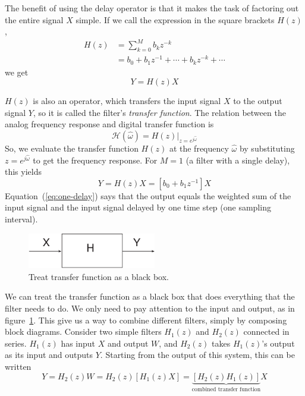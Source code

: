 The benefit of using the delay operator is that it makes the task of
factoring out the entire signal $X$ simple. If we call the expression
in the square brackets $H(z)$,
\begin{align}
H(z) &= \sum_{k=0}^M b_k z^{-k}\\
     &= b_0 + b_1z^{-1} + \cdots + b_k z^{-k} + \cdots
\end{align}
we get
\begin{equation}
Y = H(z)X
\end{equation}

$H(z)$ is also an operator, which transfers the input signal
$X$ to the output signal $Y$, so it is called the filter's
\emph{transfer function}. 
%
%
The relation between the analog frequency
response and digital transfer function is
\begin{equation}
\mathcal{H}(\hat{\omega}) = H(z)|_{z=e^{j\hat{\omega}}}
\end{equation}
So, we evaluate the transfer function $H(z)$ at the frequency
$\hat{\omega}$ by substituting $z=e^{j\hat\omega}$ to get the
frequency response.
For $M=1$ (a filter with a single delay), this yields
\begin{equation}
Y = H(z)X = [b_0 + b_1z^{-1}]X \label{eq:one-delay}
\end{equation}
Equation~(\ref{eq:one-delay}) says that the output equals the weighted
sum of the input signal and the input signal delayed by one time step
(one sampling interval).

\begin{figure}
\centerline{\includegraphics[width=0.5\textwidth]{ch-fir/ff-blackbox}}
\caption{Treat transfer function as a black box.
\label{fig:ff-blacbox}}
\end{figure}

We can treat the transfer function as a black box that does everything
that the filter needs to do. We only need to pay attention to the
input and output, as in figure~\ref{fig:ff-blacbox}.  This give us a
way to combine different filters, simply by composing block
diagrams. Consider two simple filters $H_1(z)$ and $H_2(z)$ connected
in series. $H_1(z)$ has input $X$ and output $W$, and $H_2(z)$ takes
$H_1(z)$'s output as its input and outputs $Y$. Starting from the
output of this system, this can be written
\begin{equation}
Y = H_2(z)W = H_2(z)[H_1(z)X]
  = \underbrace{[H_2(z)H_1(z)]}_{\text{combined transfer function}} X
\end{equation}


